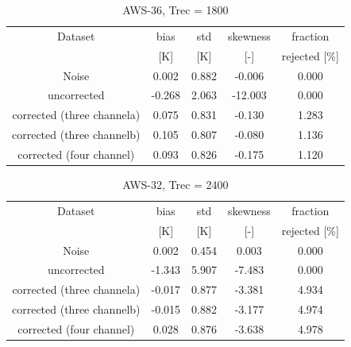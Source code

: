 \documentclass[12pt]{article}
\begin{document}
\begin{table}[!p]
	\centering
	\begin{tabular}[b]{c|c|c|c|c}
		Dataset  		  &   bias &   std &   skewness & fraction  \\
		&   [K]  &   [K] & [-] & rejected [\%]\\
		\hline
Noise                      &  0.002 & 0.882 &             -0.006 &      0.000 \\
uncorrected                & -0.268 & 2.063 &            -12.003 &      0.000 \\
corrected (three channela) &  0.075 & 0.831 &             -0.130 &      1.283 \\
corrected (three channelb) &  0.105 & 0.807 &             -0.080 &      1.136 \\
corrected (four channel)   &  0.093 & 0.826 &             -0.175 &      1.120 \\
		\hline
	\end{tabular}
	\caption{ AWS-36, Trec = 1800 }
	\label{tab:qrnn:C36}
\end{table}


%
\begin{table}[!p]
	\centering
	\begin{tabular}[b]{c|c|c|c|c}
		Dataset  		  &   bias &   std &   skewness & fraction  \\
		&   [K]  &   [K] & [-] & rejected [\%]\\
		\hline
Noise                       &  0.002 & 0.454 &              0.003 &      0.000 \\
uncorrected                 & -1.343 & 5.907 &             -7.483 &      0.000 \\
corrected (three channela)  & -0.017 & 0.877 &             -3.381 &      4.934 \\
corrected (three channelb)  & -0.015 & 0.882 &             -3.177 &      4.974 \\
corrected (four channel)    &  0.028 & 0.876 &             -3.638 &      4.978 \\
		\hline
	\end{tabular}
	\caption{ AWS-32, Trec = 2400 }
	\label{tab:qrnn:C36}
\end{table}
\end{document}
